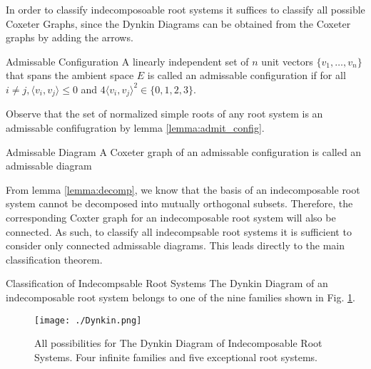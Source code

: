 In order to classify indecomposoable root systems it suffices to classify all possible Coxeter Graphs,
since the Dynkin Diagrams can be obtained from the Coxeter graphs by adding the arrows. \newline

\begin{nameddefinition}{Admissable Configuration}
    A linearly independent set of $n$ unit vectors $\{v_1, \dots, v_n \}$ that spans the ambient space
    $E$ is called an admissable configuration if for all $i\not=j, \langle v_i, v_j \rangle \leq 0$
    and $4 \langle v_i, v_j \rangle^2 \in \{0, 1, 2, 3\}$.
\end{nameddefinition}

Observe that the set of normalized simple roots of any root system is an admissable confifugration
by lemma \ref{lemma:admit_config}. \newline

\begin{nameddefinition}{Admissable Diagram}
    A Coxeter graph of an admissable configuration is called an admissable diagram
\end{nameddefinition}

From lemma \ref{lemma:decomp}, we know that the basis of an indecomposable root system cannot be
decomposed into mutually orthogonal subsets.
Therefore, the corresponding Coxter graph for an indecomposable root system will also be connected.
As such, to classify all indecompsable root systems it is sufficient to consider only connected
admissable diagrams.
This leads directly to the main classification theorem. \newline

\begin{namedtheorem}{Classification of Indecompsable Root Systems}
    The Dynkin Diagram of an indecomposable root system belongs to one of the nine families
    shown in Fig. \ref{img:dynkin}.
\end{namedtheorem}

\begin{figure}[h]
    \label{img:dynkin}
    \centering
    \texttt{[image: ./Dynkin.png]}
    \caption{All possibilities for The Dynkin Diagram of Indecomposable Root Systems. Four infinite families and five exceptional root systems.}
\end{figure}

